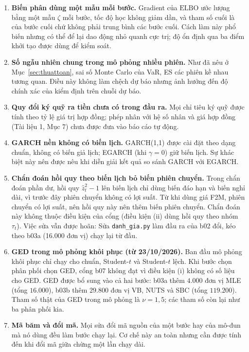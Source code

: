 \documentclass[12pt,a4paper]{article}
\newcounter{thuattoan}
\theoremstyle{remark}
\newcommand{\ELBO}{\mathrm{ELBO}}
\newcommand{\ma}[1]{\texttt{\small #1}}
\begin{document}
\begin{enumerate}
\item \textbf{Biến phân dùng một mẫu mỗi bước.} Gradient của $\ELBO$ ước lượng bằng một mẫu $\zeta$ mỗi bước, tốc độ học không giảm dần, và tham số cuối là của bước cuối chứ không phải trung bình các bước cuối. Cách làm này phổ biến nhưng có thể để lại dao động nhỏ quanh cực trị; độ ổn định qua ba điểm khởi tạo được dùng để kiểm soát.
\item \textbf{Số ngẫu nhiên chung trong mô phỏng nhiều phiên.} Như đã nêu ở Mục~\ref{sec:thuattoan}, sai số Monte Carlo của VaR, ES các phiên kề nhau tương quan. Điều này không làm chệch dự báo nhưng ảnh hưởng đến độ chính xác của kiểm định trên chuỗi dự báo.
\item \textbf{Quy đổi ký quỹ ra tiền chưa có trong đầu ra.} Mọi chỉ tiêu ký quỹ được tính theo tỷ lệ giá trị hợp đồng; phép nhân với hệ số nhân và giá hợp đồng (Tài liệu 1, Mục 7) chưa được đưa vào báo cáo tự động.
\item \textbf{GARCH nền không có biến lịch.} GARCH(1,1) được cài đặt theo dạng chuẩn, không có biến giả lịch; EGARCH (khi $\gamma=0$) giữ biến lịch. Sự khác biệt này nên được nêu khi diễn giải kết quả so sánh GARCH với EGARCH.
\item \textbf{Chẩn đoán hồi quy theo biến lịch bỏ biến phiên chuyển.} Trong chẩn đoán phần dư, hồi quy $\hat z_t^2-1$ lên biến lịch chỉ dùng biến đáo hạn và biến nghỉ dài, vì trước đây phiên chuyển không có lợi suất. Từ khi dùng giá F2M, phiên chuyển có lợi suất, nên hồi quy này nên thêm biến phiên chuyển. Chẩn đoán này không thuộc điều kiện của cổng (điều kiện (ii) dùng hồi quy theo nhóm $\tau_t$). Việc sửa vẫn được hoãn: Sửa \ma{danh\_gia.py} làm đầu ra của b02 đổi, kéo theo b03a (16.000 đơn vị) chạy lại từ đầu.
\item \textbf{GED trong mô phỏng khôi phục (từ 23/10/2026).} Ban đầu mô phỏng khôi phục chỉ chạy cho chuẩn, Student-$t$ và Student-$t$ lệch. Khi bước chọn phân phối chọn GED, cổng b07 không đạt vì điều kiện (i) không có số liệu cho GED. GED được bổ sung vào cả hai bước: b03a thêm $4.000$ đơn vị MLE (tổng $16.000$), b03b thêm $29.800$ đơn vị VB, NUTS và SBC (tổng $119.200$). Tham số thật của GED trong mô phỏng là $\nu=1{,}5$; các tham số còn lại như ba phân phối kia.
\item \textbf{Mã băm và đổi mã.} Mọi sửa đổi mã nguồn của một bước hay của mô-đun mà nó dùng đều làm bước chạy lại. Cơ chế này an toàn nhưng cần được tính đến khi đổi mã giữa chừng một lần chạy dài.
\end{enumerate}
\end{document}
